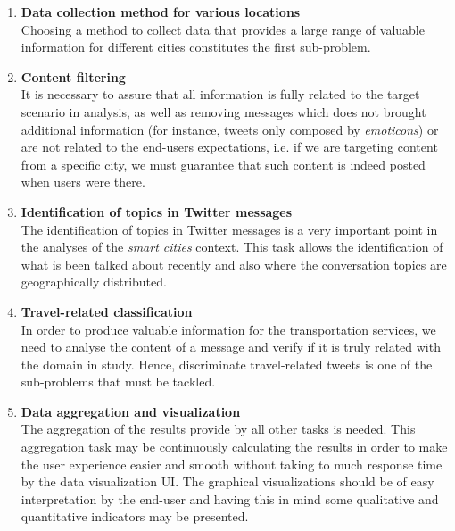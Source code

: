 \begin{enumerate}
	\item \textbf{Data collection method for various locations}\\Choosing a method to collect data that provides a large range of valuable information for different cities constitutes the first sub-problem.
	
	\item \textbf{Content filtering}\\It is necessary to assure that all information is fully related to the target scenario in analysis, as well as removing messages which does not brought additional information (for instance, tweets only composed by \textit{emoticons}) or are not related to the end-users expectations, i.e. if we are targeting content from a specific city, we must guarantee that such content is indeed posted when users were there.
	
	\item \textbf{Identification of topics in Twitter messages}\\The identification of topics in Twitter messages is a very important point in the analyses of the \textit{smart cities} context. This task allows the identification of what is been talked about recently and also where the conversation topics are geographically distributed.
	
	\item \textbf{Travel-related classification}\\In order to produce valuable information for the transportation services, we need to analyse the content of a message and verify if it is truly related with the domain in study. Hence, discriminate travel-related tweets is one of the sub-problems that must be tackled.
	
	\item \textbf{Data aggregation and visualization}\\The aggregation of the results provide by all other tasks is needed. This aggregation task may be continuously calculating the results in order to make the user experience easier and smooth without taking to much response time by the data visualization \gls{UI}. The graphical visualizations should be of easy interpretation by the end-user and having this in mind some qualitative and quantitative indicators may be presented.
\end{enumerate}

